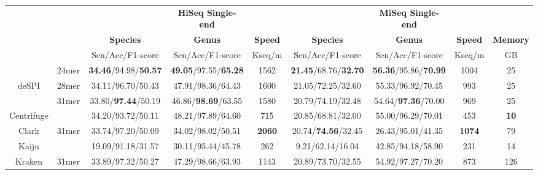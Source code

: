 \documentclass[a0,portrait]{a0poster}
\begin{document}
\begin{multicols}{2}
\begin{center}\vspace{1cm}
\footnotesize
\begin{tabular}{ccccc|ccc|c}
\toprule
& & & \textbf{HiSeq Single-end} & && \textbf{MiSeq Single-end} & & \\
& & \textbf{Species} & \textbf{Genus} & \textbf{Speed} & \textbf{Species} & \textbf{Genus} & \textbf{Speed} & \textbf{Memory}\\
\cline{3-5}\cline{6-9}
& & Sen/Acc/F1-score & Sen/Acc/F1-score & Kseq/m &Sen/Acc/F1-score & Sen/Acc/F1-score & Kseq/m & GB\\
\midrule
& 24mer &\textbf{34.46}/94.98/\textbf{50.57} & \textbf{49.05}/97.55/\textbf{65.28} & 1562 & \textbf{21.45}/68.76/\textbf{32.70} & \textbf{56.36}/95.86/\textbf{70.99} & 1004 & 25 \\
deSPI & 28mer & 34.11/96.70/50.43 & 47.91/98.36/64.43 & 1600& 21.05/72.25/32.60 & 55.33/96.92/70.45 & 993& 25\\
 & 31mer & 33.80/\textbf{97.44}/50.19 & 46.86/\textbf{98.69}/63.55 & 1580 & 20.79/74.19/32.48 & 54.64/\textbf{97.36}/70.00 & 969 & 25\\
Centrifuge	 & & 34.20/93.72/50.11 & 48.21/97.89/64.60 & 715 &20.85/68.81/32.00 & 55.00/96.29/70.01 & 453 & \textbf{10}\\
Clark & 31mer & 33.74/97.20/50.09 & 34.02/98.02/50.51 & \textbf{2060} & 20.74/\textbf{74.56}/32.45 & 26.43/95.01/41.35 & \textbf{1074} & 79 \\
Kaiju	 & & 19.09/91.18/31.57 & 30.11/95.44/45.78 & 262 & 9.21/62.14/16.04 & 42.85/94.18/58.90 & 231 & 14\\
Kraken & 31mer & 33.89/97.32/50.27 & 47.29/98.66/63.93 & 1143 & 20.89/73.70/32.55 & 54.92/97.27/70.20 & 873 & 126\\
\bottomrule 
\end{tabular}
\end{center}\vspace{1cm}


\end{multicols}
\end{document}
